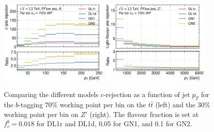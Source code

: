 \clearpage
\begin{figure}[h!]
  \centering
  \includegraphics[width=0.48\textwidth]{Images/FTAG/GN/GN2/pt_plots/pt_ttbar_flat_c_rej.png}
  \includegraphics[width=0.48\textwidth]{Images/FTAG/GN/GN2/pt_plots/pt_zp_flat_c_rej.png}
  \caption{Comparing the different models $c$-rejection as a function of jet $p_T$ for the $b$-tagging 70\% working point per bin on the $t\bar{t}$ (left) and the 30\% working point per bin on $Z'$ (right). The flavour fraction is set at $f^b_c = 0.018$ for DL1r and DL1d, 0.05 for GN1, and 0.1 for GN2.}
  \label{fig:GNxptb_crejflat}
\end{figure} 

